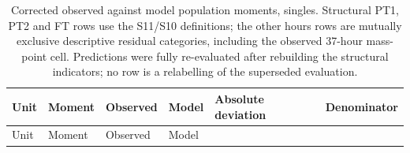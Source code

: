 \small\setlength{\tabcolsep}{3pt}\begin{longtable}[]{@{}
  >{\raggedright\arraybackslash}p{}
  >{\raggedright\arraybackslash}p{}
  >{\raggedright\arraybackslash}p{}
  >{\raggedright\arraybackslash}p{}
  >{\raggedright\arraybackslash}p{}
  >{\raggedright\arraybackslash}p{}@{}}
\caption{Corrected observed against model population moments, singles. Structural PT1, PT2 and FT rows use the S11/S10 definitions; the other hours rows are mutually exclusive descriptive residual categories, including the observed 37-hour mass-point cell. Predictions were fully re-evaluated after rebuilding the structural indicators; no row is a relabelling of the superseded evaluation.}\tabularnewline
\toprule\noalign{}
\begin{minipage}[b]{\linewidth}\raggedright
Unit
\end{minipage} & \begin{minipage}[b]{\linewidth}\raggedright
Moment
\end{minipage} & \begin{minipage}[b]{\linewidth}\raggedright
Observed
\end{minipage} & \begin{minipage}[b]{\linewidth}\raggedright
Model
\end{minipage} & \begin{minipage}[b]{\linewidth}\raggedright
Absolute deviation
\end{minipage} & \begin{minipage}[b]{\linewidth}\raggedright
Denominator
\end{minipage} \\
\midrule\noalign{}
\endfirsthead
\toprule\noalign{}
\begin{minipage}[b]{\linewidth}\raggedright
Unit
\end{minipage} & \begin{minipage}[b]{\linewidth}\raggedright
Moment
\end{minipage} & \begin{minipage}[b]{\linewidth}\raggedright
Observed
\end{minipage} & \begin{minipage}[b]{\linewidth}\raggedright
Model
\end{minipage} & \begin{minipage}[b]{\linewidth}\raggedright

\end{minipage}
\end{longtable}
